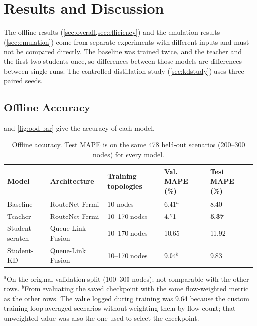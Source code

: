 \chapter{Results and Discussion}
\label{ch:results}

The offline results (\cref{sec:overall,sec:efficiency}) and the emulation results (\cref{sec:emulation}) come from separate experiments with different inputs and must not be compared directly. The baseline was trained twice, and the teacher and the first two students once, so differences between those models are differences between single runs. The controlled distillation study (\cref{sec:kdstudy}) uses three paired seeds.

\section{Offline Accuracy}
\label{sec:overall}

 and \cref{fig:ood-bar} give the accuracy of each model.

\begin{table}[ht]
\centering
\small
\caption{Offline accuracy. Test MAPE is on the same 478 held-out scenarios (200--300 nodes) for every model.}
\label{tab:main}
\begin{tabular}{@{}l l C{24mm} C{18mm} C{18mm}@{}}
\toprule
\textbf{Model} & \textbf{Architecture} & \textbf{Training topologies} & \textbf{Val. MAPE (\%)} & \textbf{Test MAPE (\%)} \\
\midrule
Baseline        & RouteNet-Fermi    & 10 nodes      & 6.41$^{a}$ & 8.40 \\
Teacher         & RouteNet-Fermi    & 10--170 nodes & 4.71       & \textbf{5.37} \\
Student-scratch & Queue-Link Fusion & 10--170 nodes & 10.65      & 11.92 \\
Student-KD      & Queue-Link Fusion & 10--170 nodes & 9.04$^{b}$ & 9.83 \\
\bottomrule
\end{tabular}

\vspace{1mm}
\begin{minipage}{0.95\textwidth}\footnotesize
$^{a}$On the original validation split (100--300 nodes); not comparable with the other rows.
$^{b}$From evaluating the saved checkpoint with the same flow-weighted metric as the other rows. The value logged during training was 9.64 because the custom training loop averaged scenarios without weighting them by flow count; that unweighted value was also the one used to select the checkpoint.
\end{minipage}
\end{table}

